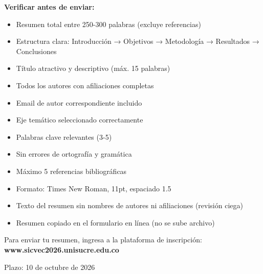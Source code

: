 \documentclass[12pt,a4paper]{article}
\begin{document}
\begin{tcolorbox}[enhanced, colback=yellow!10, colframe=orange, boxrule=1pt, left=10pt, right=10pt, top=10pt, bottom=10pt]

\textbf{Verificar antes de enviar:}

\begin{itemize}
  \item[$\square$] Resumen total entre 250-300 palabras (excluye referencias)
  \item[$\square$] Estructura clara: Introducción → Objetivos → Metodología → Resultados → Conclusiones
  \item[$\square$] Título atractivo y descriptivo (máx. 15 palabras)
  \item[$\square$] Todos los autores con afiliaciones completas
  \item[$\square$] Email de autor correspondiente incluido
  \item[$\square$] Eje temático seleccionado correctamente
  \item[$\square$] Palabras clave relevantes (3-5)
  \item[$\square$] Sin errores de ortografía y gramática
  \item[$\square$] Máximo 5 referencias bibliográficas
  \item[$\square$] Formato: Times New Roman, 11pt, espaciado 1.5
  \item[$\square$] Texto del resumen sin nombres de autores ni afiliaciones (revisión ciega)
  \item[$\square$] Resumen copiado en el formulario en línea (no se sube archivo)
\end{itemize}

\end{tcolorbox}

\vspace{1.5cm}

\begin{center}
{\small\color{verdemid} Para enviar tu resumen, ingresa a la plataforma de inscripción:\\
\textbf{www.sicvec2026.unisucre.edu.co}}

{\small\color{verdeosc} Plazo: 10 de octubre de 2026}
\end{center}
\end{document}
